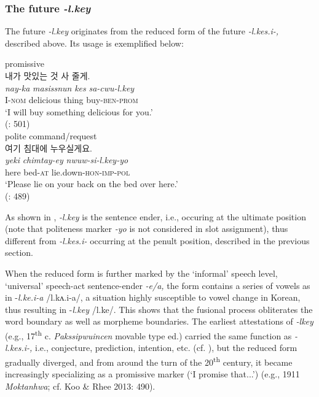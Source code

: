\documentclass[output=paper,colorlinks,citecolor=brown]{langscibook}
\begin{document}
\largerpage[1.5]

\subsubsection{The future \textit{-l.key}} \label{sec:2.2.2}

The future \textit{-l.key} originates from the reduced form of the future \textit{-l.kes.i-,} described above. Its usage is exemplified below: 

\ea \label{ex:rhee:8}
    \ea promissive\\ \label{ex:rhee:8a}
    \textkorean{내가 맛있는 것 사 줄게}.\\
    \gll \textit{nay-ka} \textit{masissnun} \textit{kes} \textit{sa-cwu-l.key}\\
         I-\textsc{nom} delicious thing buy-\textsc{ben-prom}\\
    \glt ‘I will buy something delicious for you.’\\
    \hfill (\cite{Lee2010}: 501)\\

    \ex polite command/request\\ \label{ex:rhee:8b}
    \textkorean{여기 침대에 누우실게요.}\\
    \gll \textit{yeki} \textit{chimtay-ey} \textit{nwuw-si-l.key-yo}\\
         here bed-\textsc{at} lie.down-\textsc{hon-imp-pol}\\
    \glt ‘Please lie on your back on the bed over here.’\\ \hfill (\cite{KooRhee2013}: 489)\\
    \z
\z

As shown in , \textit{-l.key} is the sentence ender, i.e., occuring at the ultimate position (note that politeness marker \textit{-yo} is not considered in slot assignment), thus different from \textit{-l.kes.i-} occurring at the penult position, described in the previous section. 

When the reduced form is further marked by the ‘informal’ speech level, ‘universal’ speech-act sentence-ender \textit{-e/a,} the form contains a series of vowels as in -\textit{l.ke.i-a} /l.kʌ.i-a/, a situation highly susceptible to vowel change in Korean, thus resulting in -\textit{l.key} /l.ke/. This shows that the fusional process obliterates the word boundary as well as morpheme boundaries. The earliest attestations of \textit{-lkey} (e.g., 17\textsuperscript{th} c. \textit{Pakssipwuincen} movable type ed.) carried the same function as \textit{-l.kes.i-,} i.e., conjecture, prediction, intention, etc. (cf. \citep[490]{KooRhee2013}), but the reduced form gradually diverged, and from around the turn of the 20\textsuperscript{th} century, it became increasingly specializing as a promissive marker (‘I promise that...’) (e.g., 1911 \textit{Moktanhwa}; cf. Koo \& Rhee 2013: 490).
\end{document}
